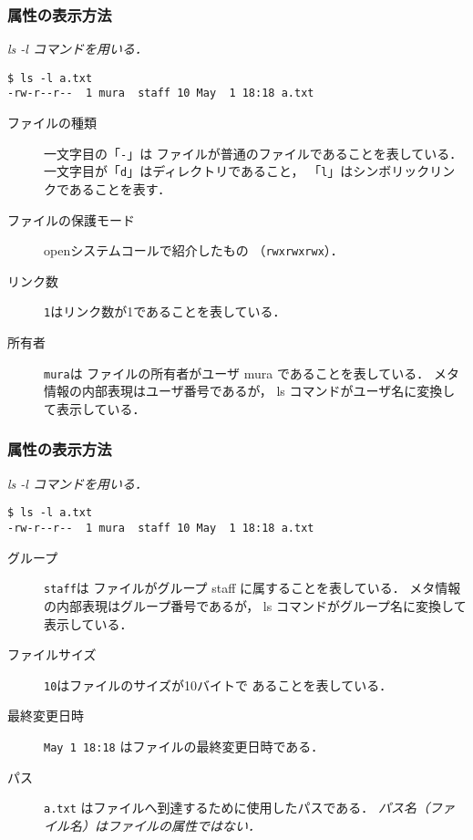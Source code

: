 \documentclass{beamer}                 %
\begin{document}
\begin{frame}[fragile]
  \frametitle{属性の表示方法}
  \emph{ls -l コマンドを用いる．}
  \begin{lstlisting}[numbers=none]
$ ls -l a.txt
-rw-r--r--  1 mura  staff 10 May  1 18:18 a.txt
  \end{lstlisting}
\begin{description}
\item[ファイルの種類] 一文字目の「\texttt{-}」は
ファイルが普通のファイルであることを表している．
一文字目が「\texttt{d}」はディレクトリであること，
「\texttt{l}」はシンボリックリンクであることを表す．
\item[ファイルの保護モード] openシステムコールで紹介したもの
（\texttt{rwxrwxrwx}）．
\item[リンク数] \texttt{1}はリンク数が1であることを表している．
\item[所有者] \texttt{mura}は
ファイルの所有者がユーザ mura であることを表している．
メタ情報の内部表現はユーザ番号であるが，
ls コマンドがユーザ名に変換して表示している．
\end{description}
\end{frame}

\begin{frame}[fragile]
  \frametitle{属性の表示方法}
  \emph{ls -l コマンドを用いる．}
  \begin{lstlisting}[numbers=none]
$ ls -l a.txt
-rw-r--r--  1 mura  staff 10 May  1 18:18 a.txt
  \end{lstlisting}
\begin{description}
\item[グループ] \texttt{staff}は
ファイルがグループ staff に属することを表している．
メタ情報の内部表現はグループ番号であるが，
ls コマンドがグループ名に変換して表示している．
\item[ファイルサイズ] \texttt{10}はファイルのサイズが10バイトで
あることを表している．
\item[最終変更日時] \texttt{May 1 18:18} はファイルの最終変更日時である．
\item[パス] \texttt{a.txt} はファイルへ到達するために使用したパスである．
\emph{パス名（ファイル名）はファイルの属性ではない．}
\end{description}
\end{frame}
\end{document}
